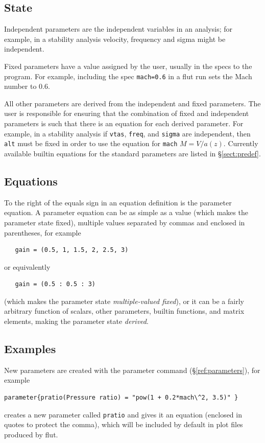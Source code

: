 \documentclass[11pt,openany,twoside]{book}
\numberwithin{equation}{section}		%
\newcommand{\Cmd}[1]{{\sf #1}}
\newcommand{\Newterm}[1]{{\em #1}}	%
\newcommand{\Code}[1]{{\small\tt #1}}
\newcommand{\Sectref}[1]{\S\ref{#1}}
\begin{document}
\subsection{State}\label{sect:parstate}
Independent parameters are the independent variables
in an analysis; for example, in a stability analysis velocity, frequency and
sigma might be independent.
\par
Fixed parameters
have a value assigned
by the user, usually in the specs to the program. For example,
including the spec \Code{mach=0.6} in a \Cmd{flut}
run sets the Mach number to 0.6.
\par
All other parameters are derived
from the independent and fixed parameters. The user is responsible for
ensuring that the combination of fixed and independent parameters is
such that there is an equation for each derived parameter.
For example, in a stability analysis if \Code{vtas},
\Code{freq}, and \Code{sigma} are independent, then
\Code{alt} must be fixed in order to use the equation
for \Code{mach} $M = V/a(z)$.
Currently available builtin equations for the standard parameters
are listed in \Sectref{sect:predef}.

\subsection{Equations}\label{sect:pareqns}
To the right of the equals sign in an equation definition is
the parameter equation.
A parameter equation can be as simple as a value (which makes
the parameter state fixed),
multiple values separated
by commas and enclosed in parentheses, for example
\begin{lstlisting}
   gain = (0.5, 1, 1.5, 2, 2.5, 3)
\end{lstlisting}
or equivalently
\begin{lstlisting}
   gain = (0.5 : 0.5 : 3)
\end{lstlisting}

(which makes the parameter state \Newterm{multiple-valued fixed}),
or it can be a fairly arbitrary function of scalars, other parameters,
builtin functions, and matrix elements,
making the parameter state \Newterm{derived}.
\par

\subsection{Examples} \label{sect:par-examples}
New parameters are created with the
\Cmd{parameter} command (\Sectref{ref:parameters}),
for example
\begin{lstlisting}
parameter{pratio(Pressure ratio) = "pow(1 + 0.2*mach\^2, 3.5)" }
\end{lstlisting}
creates a new parameter called \Code{pratio} and gives it an equation
(enclosed in quotes to protect the comma), which will be included by
default in plot files produced by \Cmd{flut}.
\end{document}
